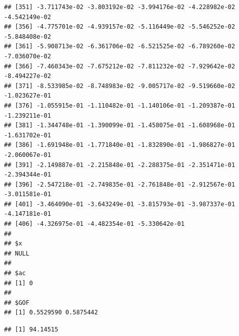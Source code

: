 \documentclass[]{article}
\newenvironment{Shaded}{\begin{snugshade}}{\end{snugshade}}
\newcommand{\AttributeTok}[1]{\textcolor[rgb]{0.77,0.63,0.00}{#1}}
\newcommand{\CommentTok}[1]{\textcolor[rgb]{0.56,0.35,0.01}{\textit{#1}}}
\newcommand{\DecValTok}[1]{\textcolor[rgb]{0.00,0.00,0.81}{#1}}
\newcommand{\FunctionTok}[1]{\textcolor[rgb]{0.00,0.00,0.00}{#1}}
\newcommand{\KeywordTok}[1]{\textcolor[rgb]{0.13,0.29,0.53}{\textbf{#1}}}
\newcommand{\NormalTok}[1]{#1}
\newcommand{\OperatorTok}[1]{\textcolor[rgb]{0.81,0.36,0.00}{\textbf{#1}}}
\begin{document}
\begin{verbatim}
## [351] -3.711743e-02 -3.803192e-02 -3.994176e-02 -4.228982e-02 -4.542149e-02
## [356] -4.775701e-02 -4.939157e-02 -5.116449e-02 -5.546252e-02 -5.848408e-02
## [361] -5.908713e-02 -6.361706e-02 -6.521525e-02 -6.789260e-02 -7.036070e-02
## [366] -7.460343e-02 -7.675212e-02 -7.811232e-02 -7.929642e-02 -8.494227e-02
## [371] -8.533985e-02 -8.748983e-02 -9.005717e-02 -9.519660e-02 -1.023627e-01
## [376] -1.055915e-01 -1.110482e-01 -1.140106e-01 -1.209387e-01 -1.239211e-01
## [381] -1.344748e-01 -1.390099e-01 -1.458075e-01 -1.608968e-01 -1.631702e-01
## [386] -1.691948e-01 -1.771840e-01 -1.832890e-01 -1.986827e-01 -2.060067e-01
## [391] -2.149887e-01 -2.215848e-01 -2.288375e-01 -2.351471e-01 -2.394344e-01
## [396] -2.547218e-01 -2.749835e-01 -2.761848e-01 -2.912567e-01 -3.011581e-01
## [401] -3.464090e-01 -3.643249e-01 -3.815793e-01 -3.987337e-01 -4.147181e-01
## [406] -4.326975e-01 -4.482354e-01 -5.330642e-01
## 
## $x
## NULL
## 
## $ac
## [1] 0
## 
## $GOF
## [1] 0.5529590 0.5875442
\end{verbatim}

\begin{Shaded}
\end{Shaded}

\begin{verbatim}
## [1] 94.14515
\end{verbatim}

\begin{Shaded}
\end{Shaded}
\end{document}
